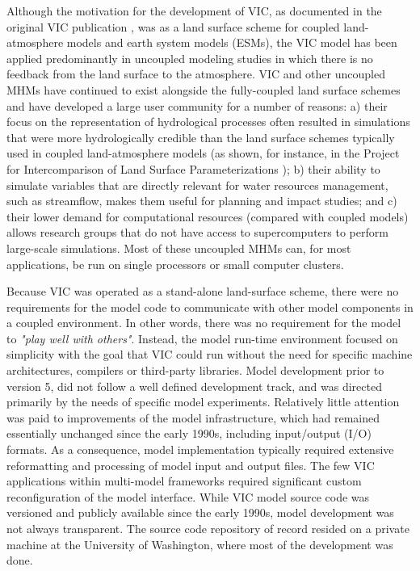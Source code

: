 \documentclass[gmd, manuscript]{copernicus}
\begin{document}
  Although the motivation for the development of VIC, as documented in the original VIC publication \citep{Liang_1994}, was as a land surface scheme for coupled land-atmosphere models and earth system models (ESMs), the VIC model has been applied predominantly in uncoupled modeling studies in which there is no feedback from the land surface to the atmosphere. VIC and other uncoupled MHMs have continued to exist alongside the fully-coupled land surface schemes and have developed a large user community for a number of reasons: a) their focus on the representation of hydrological processes often resulted in simulations that were more hydrologically credible than the land surface schemes typically used in coupled land-atmosphere models (as shown, for instance, in the Project for Intercomparison of Land Surface Parameterizations \citep[PILPS;][]{Bowling_2003,wood_1998}); b) their ability to simulate variables that are directly relevant for water resources management, such as streamflow, makes them useful for planning and impact studies; and c) their lower demand for computational resources (compared with coupled models) allows research groups that do not have access to supercomputers to perform large-scale simulations. Most of these uncoupled MHMs can, for most applications, be run on single processors or small computer clusters.

  Because VIC was operated as a stand-alone land-surface scheme, there were no requirements for the model code to communicate with other model components in a coupled environment. In other words, there was no requirement for the model to \textit{"play well with others"}. Instead, the model run-time environment focused on simplicity with the goal that VIC could run without the need for specific machine architectures, compilers or third-party libraries. Model development prior to version 5, did not follow a well defined development track, and was directed primarily by the needs of specific model experiments. Relatively little attention was paid to improvements of the model infrastructure, which had remained essentially unchanged since the early 1990s, including input/output (I/O) formats. As a consequence, model implementation typically required extensive reformatting and processing of model input and output files. The few VIC applications within multi-model frameworks \citep[e.g. NASA LIS, ][]{Kumar_2006} required significant custom reconfiguration of the model interface. While VIC model source code was versioned and publicly available since the early 1990s, model development was not always transparent. The source code repository of record resided on a private machine at the University of Washington, where most of the development was done.
\end{document}

